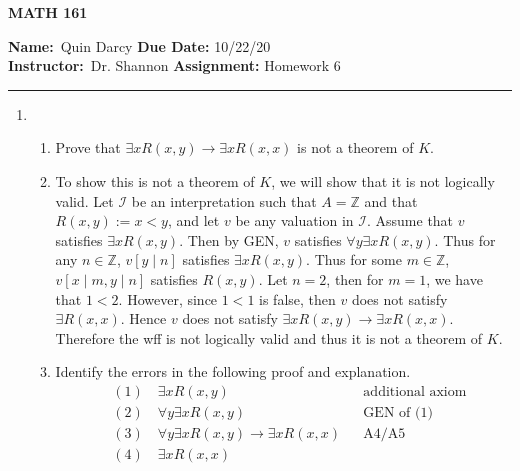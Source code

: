 \documentclass[12pt]{article}
\makeatletter
\theoremstyle{definition}
\theoremstyle{remark}
\renewenvironment{proof}[1][\proofname]{\par
  \pushQED{\qed}%
  \normalfont \topsep6\p@\@plus6\p@\relax
  \list{}{\leftmargin=0mm
          \rightmargin=4mm
          \settowidth{\itemindent}{\itshape#1}%
          \labelwidth=\itemindent
          \parsep=0pt \listparindent=\parindent 
  }
  \item[\hskip\labelsep
        \itshape
    #1\@addpunct{.}]\ignorespaces
}{%
  \popQED\endlist\@endpefalse
}
\let\oldproofname=\proofname
\renewcommand{\proofname}{\bf{\textit{\oldproofname}}}
\makeatother
\begin{document}
\thispagestyle{empty}\hline

\begin{center}
	\vspace{.4cm} {\textbf { \large MATH 161}}
\end{center}
{\textbf{Name:}\ Quin Darcy \hspace{\fill} \textbf{Due Date:} 10/22/20   \\
{ \textbf{Instructor:}}\ Dr. Shannon \hspace{\fill} \textbf{Assignment:} Homework 6 \\ \hrule}

\justifying
    \begin{enumerate}[leftmargin=*]
        \item\hfill\par 
            \begin{enumerate}
                \item Prove that $\exists xR(x,y)\rightarrow\exists xR(x,x)$ is not a theorem of $K$.
                    \begin{proof}
                        To show this is not a theorem of $K$, we will show that it is not logically valid. Let $\mathcal{I}$ be an interpretation such that $A=\mathbb{Z}$ and that $R(x,y):=x<y$, and let $v$ be any valuation in $\mathcal{I}$. Assume that $v$ satisfies $\exists xR(x,y)$. Then by GEN, $v$ satisfies $\forall y\exists x R(x,y)$. Thus for any $n\in\mathbb{Z}$, $v[y\mid n]$ satisfies $\exists xR(x,y)$. Thus for some $m\in\mathbb{Z}$, $v[x\mid m,y\mid n]$ satisfies $R(x,y)$. Let $n=2$, then for $m=1$, we have that $1<2$. However, since $1<1$ is false, then $v$ does not satisfy $\exists R(x,x)$. Hence $v$ does not satisfy $\exists xR(x,y)\rightarrow\exists xR(x,x)$. Therefore the wff is not logically valid and thus it is not a theorem of $K$.
                    \end{proof}
                \item Identify the errors in the following proof and explanation.
                    \begin{align*}
                        &(1) \quad\exists xR(x,y) &&\text{additional axiom} \\
                        &(2) \quad\forall y\exists xR(x,y) && \text{GEN of (1)} \\
                        &(3) \quad\forall y\exists xR(x,y)\rightarrow\exists xR(x,x) && \text{A4/A5} \\
                        &(4) \quad\exists xR(x,x) && \text{} \\

\end{align*}
\end{enumerate}
\end{enumerate}
\end{document}
